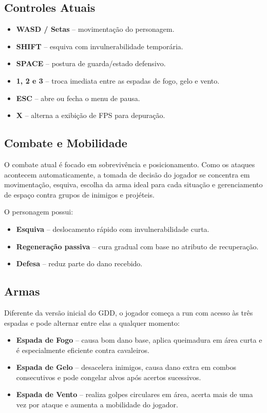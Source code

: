 \documentclass[a4paper,12pt]{article}
\begin{document}
\pagebreak

\subsection*{Controles Atuais}

\begin{itemize}
    \item \textbf{WASD / Setas} -- movimentação do personagem.
    \item \textbf{SHIFT} -- esquiva com invulnerabilidade temporária.
    \item \textbf{SPACE} -- postura de guarda/estado defensivo.
    \item \textbf{1, 2 e 3} -- troca imediata entre as espadas de fogo, gelo e vento.
    \item \textbf{ESC} -- abre ou fecha o menu de pausa.
    \item \textbf{X} -- alterna a exibição de FPS para depuração.
\end{itemize}

\subsection*{Combate e Mobilidade}

O combate atual é focado em sobrevivência e posicionamento. Como os ataques acontecem automaticamente, a tomada de decisão do jogador se concentra em movimentação, esquiva, escolha da arma ideal para cada situação e gerenciamento de espaço contra grupos de inimigos e projéteis.

O personagem possui:

\begin{itemize}
    \item \textbf{Esquiva} -- deslocamento rápido com invulnerabilidade curta.
    \item \textbf{Regeneração passiva} -- cura gradual com base no atributo de recuperação.
    \item \textbf{Defesa} -- reduz parte do dano recebido.
\end{itemize}

\subsection*{Armas}

Diferente da versão inicial do GDD, o jogador começa a run com acesso às três espadas e pode alternar entre elas a qualquer momento:

\begin{itemize}
    \item \textbf{Espada de Fogo} -- causa bom dano base, aplica queimadura em área curta e é especialmente eficiente contra cavaleiros.
    \item \textbf{Espada de Gelo} -- desacelera inimigos, causa dano extra em combos consecutivos e pode congelar alvos após acertos sucessivos.
    \item \textbf{Espada de Vento} -- realiza golpes circulares em área, acerta mais de uma vez por ataque e aumenta a mobilidade do jogador.
\end{itemize}
\end{document}
